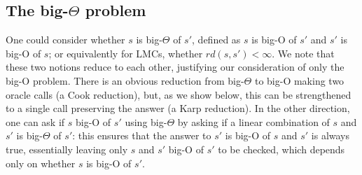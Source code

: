 \documentclass{lmcs}
\theoremstyle{plain}
\theoremstyle{definition}
\theoremstyle{remark}
\newcommand\tvrs{\mathit{rd}}
\begin{document}
\subsection{The big-\texorpdfstring{$\Theta$}{Theta} problem}
One could consider whether $s$ is big-$\Theta$ of $s'$, defined as $s$ is big-O of $s'$ and $s'$ is big-O of $s$; or equivalently for LMCs, whether $\tvrs(s,s') <  \infty$. We note that these two notions reduce to each other, justifying our consideration of only the big-O problem. There is an obvious reduction from big-$\Theta$  to big-O making two oracle calls (a Cook reduction), but, as we show below, this can be strengthened to a single call preserving the answer (a Karp reduction). In the other direction, one can ask if $s$ big-O of $s'$ using big-$\Theta$ by asking if a linear combination of $s$ and $s'$ is big-$\Theta$ of $s'$: this ensures that the answer to $s'$ is big-O of $s$ and $s'$ is always true, essentially leaving only $s$ and $s'$ big-O of $s'$ to be checked, which depends only on whether $s$ is big-O of $s'$.
\end{document}
